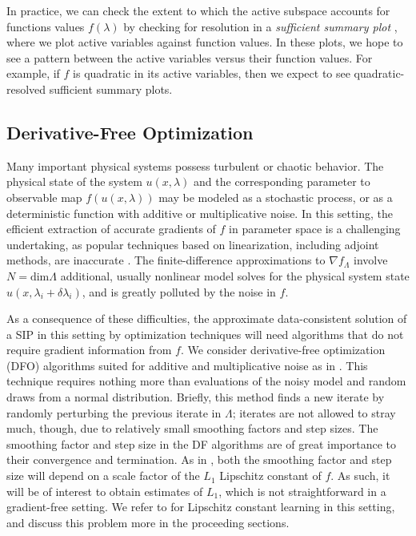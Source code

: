 \documentclass{amsart}
\begin{document}
In practice, we can check the extent to which the active subspace accounts for functions values $f(\lambda)$ 
by checking for resolution in a \emph{sufficient summary plot} \cite{Constantine2015}, where we plot active variables against function values. In these plots, we hope to see a pattern between the active variables versus their function values. For example, if $f$ is quadratic in its active variables, then we expect to see quadratic-resolved sufficient summary plots.





\subsection{Derivative-Free Optimization}

Many important physical systems possess turbulent or chaotic behavior.  The physical state of the system $u(x,\lambda)$ and the corresponding parameter
to observable map $f(u(x,\lambda))$ may be modeled as a stochastic process, or as a deterministic function with additive or multiplicative noise.  
In this setting, the efficient extraction of accurate gradients of $f$ in parameter space is a challenging undertaking, as popular techniques based on
linearization, including adjoint methods, are inaccurate \cite{lea2000, Qiqi2014}.  
The finite-difference approximations to $\nabla f_\Lambda$ 
involve $N=\text{dim}\Lambda$ 
additional, usually nonlinear model solves for the physical system state $u(x,\lambda_i + \delta \lambda_i)$, and is greatly polluted by the noise in $f$.

As a consequence of these difficulties, the approximate data-consistent solution of a SIP in this setting by optimization techniques will need algorithms
that do not require gradient information from $f$.  
We consider derivative-free optimization (DFO) algorithms suited for additive and multiplicative noise as in \cite{CW}. This technique requires nothing more than evaluations of the noisy model and random draws from a normal distribution. Briefly, this method finds a new iterate by randomly perturbing the previous iterate in $\Lambda$; iterates are not allowed to stray much, though, due to relatively small smoothing factors and step sizes. The smoothing factor and step size in the DF algorithms are of great importance to their convergence and termination. As in \cite{CW}, both the smoothing factor and step size will depend on a scale factor of the $L_1$ Lipschitz constant of $f$. As such, it will be of interest to obtain estimates of $L_1$, which is not straightforward in a gradient-free setting. We refer to \cite{KS} for Lipschitz constant learning in this setting, and discuss this problem more in the proceeding sections.
\end{document}
